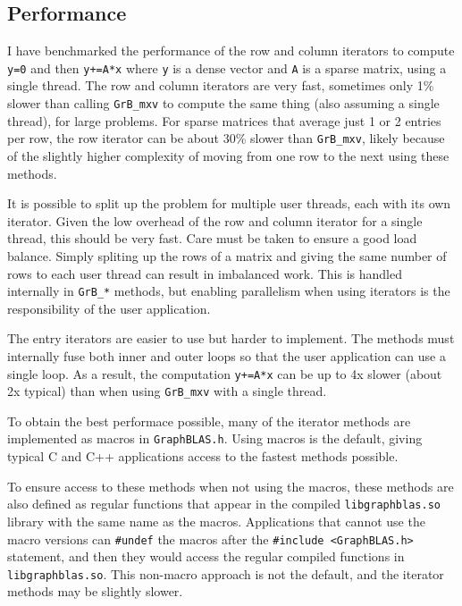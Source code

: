 \documentclass[12pt]{article}
\begin{document}
{%
\newpage
\subsection{Performance}

I have benchmarked the performance of the row and column iterators to compute
\verb'y=0' and then \verb'y+=A*x' where \verb'y' is a dense vector and \verb'A'
is a sparse matrix, using a single thread.  The row and column iterators are
very fast, sometimes only 1\% slower than calling \verb'GrB_mxv' to compute the
same thing (also assuming a single thread), for large problems.  For sparse
matrices that average just 1 or 2 entries per row, the row iterator can be
about 30\% slower than \verb'GrB_mxv', likely because of the slightly higher
complexity of moving from one row to the next using these methods.

It is possible to split up the problem for multiple user threads, each with its
own iterator.  Given the low overhead of the row and column iterator for a
single thread, this should be very fast.  Care must be taken to ensure a good
load balance.  Simply spliting up the rows of a matrix and giving the same
number of rows to each user thread can result in imbalanced work.  This is
handled internally in \verb'GrB_*' methods, but enabling parallelism when using
iterators is the responsibility of the user application.

The entry iterators are easier to use but harder to implement.  The methods
must internally fuse both inner and outer loops so that the user application can
use a single loop.  As a result, the computation \verb'y+=A*x' can be up to
4x slower (about 2x typical) than when using \verb'GrB_mxv' with a single
thread.

To obtain the best performace possible, many of the iterator methods are
implemented as macros in \verb'GraphBLAS.h'.  Using macros is the default,
giving typical C and C++ applications access to the fastest methods possible.

To ensure access to these methods when not using the macros, these methods are
also defined as regular functions that appear in the compiled
\verb'libgraphblas.so' library with the same name as the macros.  Applications
that cannot use the macro versions can \verb'#undef' the macros after the
\verb'#include <GraphBLAS.h>' statement, and then they would access the regular
compiled functions in \verb'libgraphblas.so'.  This non-macro approach is not
the default, and the iterator methods may be slightly slower.

}
\end{document}
